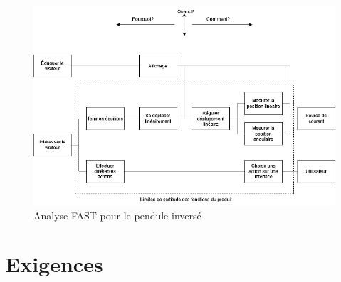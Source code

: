 \begin{figure}[H]
    \centering
    \includegraphics[width = \textwidth]{assets/figures/AnalyseFAST.png}
    \caption{Analyse FAST pour le pendule inversé}
    \label{fig:AnalFAST}
\end{figure}

\section{Exigences}\label{sec:Exigences}

